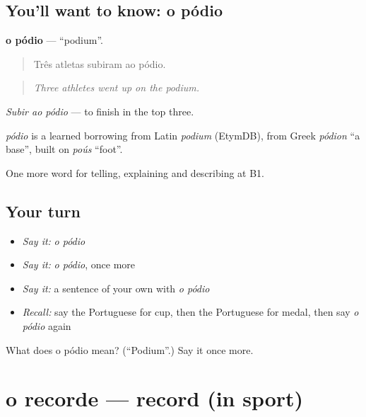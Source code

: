 \subsection*{You'll want to know: o pódio}
\textbf{o pódio} — \textquotedblleft{}podium\textquotedblright{}.

\begin{quote}
Três atletas subiram ao pódio.
\end{quote}

\begin{quote}
\emph{Three athletes went up on the podium.}
\end{quote}

\emph{Subir ao pódio} — to finish in the top three.

\begin{cousinweb}
\emph{pódio} is a learned borrowing from Latin \emph{podium} (EtymDB), from Greek \emph{pódion} \textquotedblleft{}a base\textquotedblright{}, built on \emph{poús} \textquotedblleft{}foot\textquotedblright{}.
\end{cousinweb}

\begin{grammarlens}[title={What you've built}]
One more word for telling, explaining and describing at B1.
\end{grammarlens}

\subsection*{Your turn}
\begin{itemize}
\raggedright
  \item \emph{Say it:} \emph{o pódio}
  \item \emph{Say it:} \emph{o pódio}, once more
  \item \emph{Say it:} a sentence of your own with \emph{o pódio}
  \item \emph{Recall:} say the Portuguese for cup, then the Portuguese for medal, then say \emph{o pódio} again
\end{itemize}

\begin{tcolorbox}[breakable,colback=teal!4,colframe=teal!35!black,title={Before you move on}]
What does o pódio mean? (\textquotedblleft{}Podium\textquotedblright{}.) Say it once more.
\end{tcolorbox}
\section[o recorde]{o recorde — record (in sport)}

